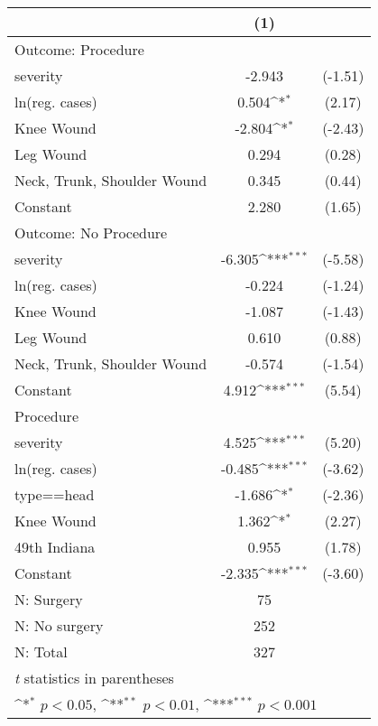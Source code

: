 {
\def\sym#1{\ifmmode^{#1}\else\(^{#1}\)\fi}
\begin{tabular}{l*{1}{cc}}
\hline\hline
                    &\multicolumn{1}{c}{(1)}         &            \\
\hline
Outcome: Procedure  &                     &            \\
severity            &      -2.943         &     (-1.51)\\
ln(reg. cases)      &       0.504\sym{*}  &      (2.17)\\
Knee Wound          &      -2.804\sym{*}  &     (-2.43)\\
Leg Wound           &       0.294         &      (0.28)\\
Neck, Trunk, Shoulder Wound&       0.345         &      (0.44)\\
Constant            &       2.280         &      (1.65)\\
\hline
Outcome: No Procedure&                     &            \\
severity            &      -6.305\sym{***}&     (-5.58)\\
ln(reg. cases)      &      -0.224         &     (-1.24)\\
Knee Wound          &      -1.087         &     (-1.43)\\
Leg Wound           &       0.610         &      (0.88)\\
Neck, Trunk, Shoulder Wound&      -0.574         &     (-1.54)\\
Constant            &       4.912\sym{***}&      (5.54)\\
\hline
Procedure           &                     &            \\
severity            &       4.525\sym{***}&      (5.20)\\
ln(reg. cases)      &      -0.485\sym{***}&     (-3.62)\\
type==head          &      -1.686\sym{*}  &     (-2.36)\\
Knee Wound          &       1.362\sym{*}  &      (2.27)\\
49th Indiana        &       0.955         &      (1.78)\\
Constant            &      -2.335\sym{***}&     (-3.60)\\
\hline
N: Surgery          &          75         &            \\
N: No surgery       &         252         &            \\
N: Total            &         327         &            \\
\hline\hline
\multicolumn{3}{l}{\footnotesize \textit{t} statistics in parentheses}\\
\multicolumn{3}{l}{\footnotesize \sym{*} \(p<0.05\), \sym{**} \(p<0.01\), \sym{***} \(p<0.001\)}\\
\end{tabular}
}
